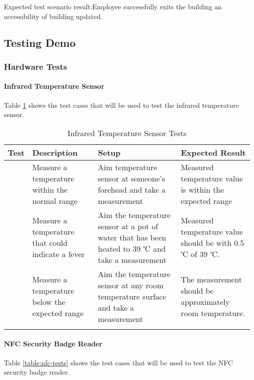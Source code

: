 \noindent
Expected test scenario result:Employee successfully exits the building an
accessibility of building updated.   

\subsection{Testing Demo}

\subsubsection{Hardware Tests}

\paragraph{Infrared Temperature Sensor}

Table \ref{table:ir-tests} shows the test cases that will be used to test the
infrared temperature sensor.

\begin{longtable}[htb]{>{\centering\arraybackslash}m{0.75cm}|>{\centering\arraybackslash}m{4cm}|>{\centering\arraybackslash}m{4.5cm}|>{\centering\arraybackslash}m{4cm}}
\toprule
Test & Description & Setup & Expected Result \\
\midrule
1 & Measure a temperature within the normal range & Aim temperature sensor at
someone's forehead and take a measurement & Measured temperature value is within
the expected range \\
\hline
2 & Measure a temperature that could indicate a fever & Aim the temperature
sensor at a pot of water that has been heated to 39 ℃ and take a measurement &
Measured temperature value should be with 0.5 ℃ of 39 ℃. \\
\hline
3 & Measure a temperature below the expected range & Aim the temperature sensor
at any room temperature surface and take a measurement & The measurement should
be approximately room temperature. \\
\bottomrule
\caption{Infrared Temperature Sensor Tests}
\label{table:ir-tests}
\end{longtable}

\paragraph{NFC Security Badge Reader}

Table \ref{table:nfc-tests} shows the test cases that will be used to test the
NFC security badge reader.

